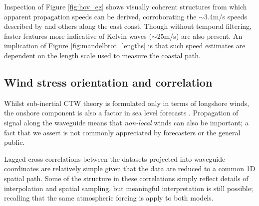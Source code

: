 Inspection of Figure \ref{fig:hov_eg} shows visually coherent structures from which apparent propagation speeds can be derived, corroborating the $\sim$3.4m/s speeds described by \citet{Woodham:2013cl} and others along the east coast.
Though without temporal filtering, faster features more indicative of Kelvin waves ($\sim$25m/s) are also present.   
An implication of Figure \ref{fig:mandelbrot_lengths} is that such speed estimates are dependent on the length scale used to measure the coastal path. 

\subsection{ Wind stress orientation and correlation }
Whilst sub-inertial CTW theory is formulated only in terms of longshore winds, the onshore component is also a factor in sea level forecasts \citep{Tilburg:2004cg}.
Propagation of signal along the waveguide means that \emph{non-local} winds can also be important; a fact that we assert is not commonly appreciated by forecasters or the general public. 


Lagged cross-correlations between the datasets projected into waveguide coordinates are relatively simple given that the data are reduced to a common 1D spatial path. 
Some of the structure in these correlations simply reflect details of interpolation and spatial sampling, but meaningful interpretation is still possible; recalling that the same atmospheric forcing is apply to both models.


